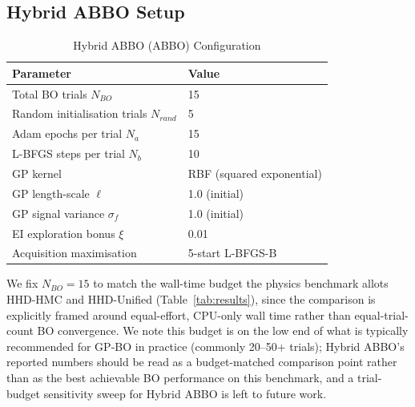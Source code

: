 \documentclass[11pt]{article}
\theoremstyle{definition}
\begin{document}
\subsection{Hybrid ABBO Setup}
\begin{table}[H]
\centering
\caption{Hybrid ABBO (ABBO) Configuration}
\label{tab:setup_b}
\renewcommand{\arraystretch}{1.2}
\begin{tabular}{ll}
\toprule
Parameter & Value \\
\midrule
Total BO trials $N_{BO}$              & 15 \\
Random initialisation trials $N_{rand}$ & 5 \\
Adam epochs per trial $N_a$           & 15 \\
L-BFGS steps per trial $N_b$          & 10 \\
GP kernel                             & RBF (squared exponential) \\
GP length-scale $\ell$                & 1.0 (initial) \\
GP signal variance $\sigma_f$         & 1.0 (initial) \\
EI exploration bonus $\xi$            & 0.01 \\
Acquisition maximisation              & 5-start L-BFGS-B \\
\bottomrule
\end{tabular}
\end{table}

We fix $N_{BO}=15$ to match the wall-time budget the physics
benchmark allots HHD-HMC and HHD-Unified (Table~\ref{tab:results}), since the
comparison is explicitly framed around equal-effort, CPU-only wall
time rather than equal-trial-count BO convergence. We note this
budget is on the low end of what is typically recommended for GP-BO
in practice (commonly 20--50+ trials); Hybrid ABBO's reported numbers
should be read as a budget-matched comparison point rather than as
the best achievable BO performance on this benchmark, and a
trial-budget sensitivity sweep for Hybrid ABBO is left to future work.
\end{document}
